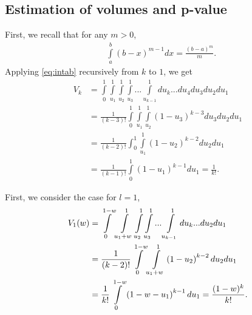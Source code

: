 \documentclass{llncs}
\begin{document}
\subsection*{Estimation of volumes and p-value}
First, we recall that for any $m > 0$,
\begin{eqnarray}
&\displaystyle \int \limits_a^b \left(b-x\right)^{m-1}dx=
\displaystyle \frac{\left(b-a\right)^m}{m} . \label{eq:intab}
\end{eqnarray} 
Applying \eqref{eq:intab} recursively from $k$ to $1$, we get
\begin{align}
V_k & = \displaystyle \int\limits_0^1\int\limits_{u_1}^1\int\limits_{u_2}^1\int\limits_{u_3}^1...\int\limits_{u_{k-1}}^1 du_k...du_4 du_3 du_2 du_1  \nonumber \\ 
& =\displaystyle \frac{1}{(k-3)!}\int\limits_0^1\int\limits_{u_1}^1\int\limits_{u_2}^1 \left( 1-u_3 \right)^{k-3}du_3 du_2 du_1  \nonumber \\
& =\displaystyle \frac{1}{(k-2)!}\int_0^1\int\limits_{u_1}^1\left( 1-u_2 \right)^{k-2} du_2 du_1  \nonumber \\
& = \displaystyle \frac{1}{(k-1)!} \int\limits_0^1\left( 1-u_1 \right)^{k-1} du_1 = \frac{1}{k!}. \label{eq:volume}
\end{align}

First, we consider the case for $l = 1$,
\begin{align}
 V_{1}(w) &=  \displaystyle \displaystyle  \int\limits_0^{1-w}\int\limits_{{u_1}+w}^1\int\limits_{u_2}^1\int\limits_{u_3}^1...\int\limits_{u_{k-1}}^1 du_k...du_2 du_1 \nonumber \\ 
& = \displaystyle \frac{1}{(k-2)!}\int\limits_0^{1-w}\int\limits_{{u_1}+w}^1\left( 1-u_2 \right)^{k-2} du_2 du_1 \nonumber \\
& = \displaystyle \frac{1}{k!} \int\limits_0^{1-w}\left( 1-w-u_1 \right)^{k-1} du_1 = \frac{(1-w)^k}{k!}. \label{eq:p_1}
\end{align}
\end{document}

